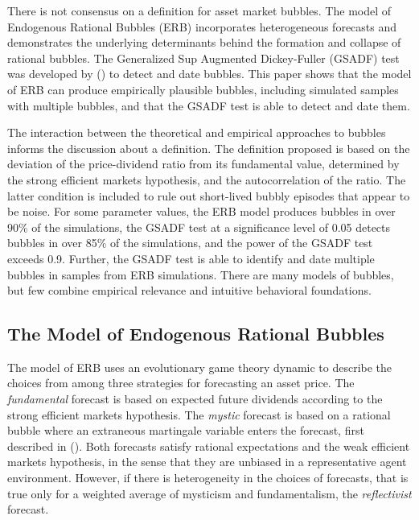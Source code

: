 \documentclass[12pt]{article}
\begin{document}
 There is not consensus on a definition for asset market bubbles. The model of Endogenous Rational Bubbles (ERB) incorporates heterogeneous forecasts and demonstrates the underlying determinants behind the formation and collapse of rational bubbles. The Generalized Sup Augmented Dickey-Fuller (GSADF) test was developed by \citeauthor{phillips2015testing} (\citeyear{phillips2015testing}) to detect and date bubbles. This paper shows that the model of ERB can produce empirically plausible bubbles, including simulated samples with multiple bubbles, and that the GSADF test is able to detect and date them.
 
The interaction between the theoretical and empirical approaches to bubbles informs the discussion about a definition. The definition proposed is based on the deviation of the price-dividend ratio from its fundamental value, determined by the strong efficient markets hypothesis, and the autocorrelation of the ratio. The latter condition is included to rule out short-lived bubbly episodes that appear to be noise. For some parameter values, the ERB model produces bubbles in over 90\% of the simulations, the GSADF test at a significance level of 0.05 detects bubbles in over 85\% of the simulations, and the power of the GSADF test exceeds 0.9. Further, the GSADF test is able to identify and date multiple bubbles in samples from ERB simulations. There are many models of bubbles, but few combine empirical relevance and intuitive behavioral foundations.

\subsection{The Model of Endogenous Rational Bubbles}

The model of ERB uses an evolutionary game theory dynamic to describe the choices from among three strategies for forecasting an asset price. The \textit{fundamental} forecast is based on expected future dividends according to the strong efficient markets hypothesis. The \textit{mystic} forecast is based on a rational bubble where an extraneous martingale variable enters the forecast, first described in \citeauthor{blanchard1979backward} (\citeyear{blanchard1979backward}). Both forecasts satisfy rational expectations and the weak efficient markets hypothesis, in the sense that they are unbiased in a representative agent environment. However, if there is heterogeneity in the choices of forecasts, that is true only for a weighted average of mysticism and fundamentalism, the \textit{reflectivist} forecast.
\end{document}
